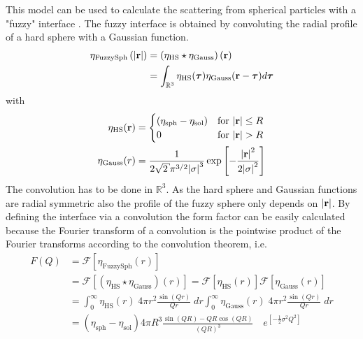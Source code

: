 This model can be used to calculate the scattering from spherical
particles with a "fuzzy" interface \cite{Stieger2004}. The fuzzy
interface is obtained by convoluting the radial profile of a hard
sphere with a Gaussian function.
\begin{align}
\eta_\text{FuzzySph}\left(\abs{\mathbf{r}}\right)
        &= \left(\eta_\text{HS}\star\eta_\text{Gauss}\right)(\mathbf{r}) \nonumber \\
        &= \int_{\mathbb{R}^3}\eta_\text{HS}(\boldsymbol{\tau}) \eta_\text{Gauss}(\mathbf{r}-\boldsymbol{\tau}) d\boldsymbol{\tau}
\end{align}
with
\begin{subequations}
\begin{align}
\eta_\text{HS}(\mathbf{r}) &=
\begin{cases}
\left(\eta_\text{sph}-\eta_\text{sol}\right) & \mbox{for~} \abs{\mathbf{r}}\leq R \\
0 & \mbox{for~} \abs{\mathbf{r}}>R
\end{cases} \\
\eta_\text{Gauss}(r) &= \frac{1}{2 \sqrt{2} \pi^{3/2}
\abs{\sigma}^3} \exp\left[ -\frac{\abs{\mathbf{r}}^2}{2
\abs{\sigma}^2}\right]
\end{align}
\end{subequations}
The convolution has to be done in $\mathbb{R}^3$. As the hard
sphere and Gaussian functions are radial symmetric also the
profile of the fuzzy sphere only depends on $\abs{\mathbf{r}}$. By
defining the interface via a convolution the form factor can be
easily calculated because the Fourier transform of a convolution
is the pointwise product of the Fourier transforms according to
the convolution theorem, i.e.
\begin{equation}
\begin{split}
F(Q) &= \mathcal{F}\left[\eta_\text{FuzzySph}(r) \right] \\
&=
  \mathcal{F}\left[\left(\eta_\text{HS}\star\eta_\text{Gauss}\right)(r)\right]
= \mathcal{F}\left[\eta_\text{HS}(r)\right] \mathcal{F}\left[\eta_\text{Gauss}(r)\right] \\
&=
   \int_0^{\infty} \eta_\text{HS}(r)\; 4\pi r^2\frac{\sin\left(Qr\right)}{Qr} \; dr \int_0^{\infty} \eta_\text{Gauss}(r)\; 4\pi r^2\frac{\sin\left(Qr\right)}{Qr} \; dr \\
&= \left(\eta_\text{sph}-\eta_\text{sol}\right) 4\pi R^3%
   \frac{\sin\left(QR\right)-QR\cos\left(QR\right)}{\left(QR\right)^3} \quad e^{\left[-\frac{1}{2}\sigma^2Q^2\right]}
\end{split}
\end{equation}

